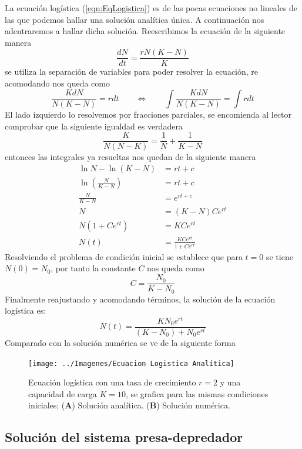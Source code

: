 La ecuación logística (\ref{eqn:EqLogistica}) es de las pocas ecuaciones no lineales de las que podemos hallar una solución analítica única. A continuación nos adentraremos a hallar dicha solución. Reescribimos la ecuación de la siguiente manera
$$\frac{dN}{dt}=\frac{rN(K-N)}{K}$$
se utiliza la separación de variables para poder resolver la ecuación, re acomodando nos queda como
$$\frac{KdN}{N(K-N)}=rdt\qquad\Longleftrightarrow\qquad \int\frac{KdN}{N(K-N)}=\int rdt$$
El lado izquierdo lo resolvemos por fracciones parciales, se encomienda al lector comprobar que la siguiente igualdad es verdadera
$$\frac{K}{N(N-K)}=\frac{1}{N}+\frac{1}{K-N}$$
entonces las integrales ya resueltas nos quedan de la siguiente manera
\begin{align*}
	\ln N-\ln(K-N)&=rt+c \\
	\ln\left (\frac{N}{K-N}\right ) &= rt+c\\
	\frac{N}{K-N}&=e^{rt+c}\\
	N&=(K-N)Ce^{rt}\\
	N(1+Ce^{rt})&=KCe^{rt}\\
	N(t)&=\frac{KCe^{rt}}{1+Ce^{rt}}
\end{align*}
Resolviendo el problema de condición inicial se establece que para $t=0$ se tiene $N(0)=N_0$, por tanto la constante $C$ nos queda como
$$C=\frac{N_0}{K-N_0}$$
Finalmente reajustando y acomodando términos, la solución de la ecuación logística es:
\begin{equation}\label{eqn:SolEqLogistica}
	N(t)=\frac{KN_0e^{rt}}{(K-N_0)+N_0e^{rt}}
\end{equation}
Comparado con la solución numérica se ve de la siguiente forma
\begin{figure}[h!]
	\centering
	\texttt{[image: ../Imagenes/Ecuacion Logistica Analítica]}
	\caption{Ecuación logística con una tasa de crecimiento $r=2$ y una capacidad de carga $K=10$, se grafica para las mismas condiciones iniciales; (\textbf{A}) Solución analítica. (\textbf{B}) Solución numérica.}
	\label{fig:EcuacionLogisticaAnalitica}
\end{figure}
\newpage
\subsection{Solución del sistema presa-depredador}\label{sec:SolPresaDepredador}

